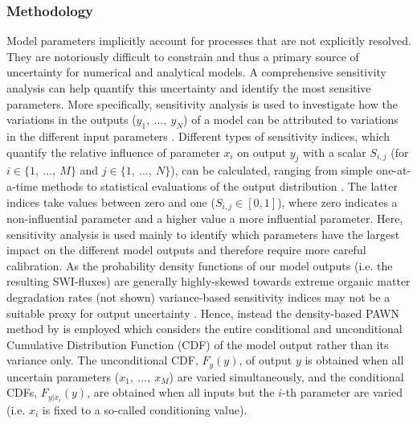 \documentclass[gmd, manuscript]{copernicus}
\begin{document}
\subsubsection{Methodology}
Model parameters implicitly account for processes that are not explicitly resolved. They are notoriously difficult to constrain and thus a primary source of uncertainty for numerical and analytical models. 
A comprehensive sensitivity analysis can help quantify this uncertainty and identify the most sensitive parameters. More specifically, sensitivity analysis is used to investigate how the variations in the outputs 
($y_1,\ ...,\ y_N$) of a model can be attributed to variations in the different input parameters \citep[$x_1,\ ...,\ x_M$,][]{pianosi_sensitivity_2016}. 
Different types of sensitivity indices, which quantify the relative influence of parameter $x_i$ on output $y_j$ with a scalar $S_{i,j}$ 
(for $i \in \{1,\ ...,\ M \}$ and $j \in \{1,\ ...,\ N \}$), can be calculated, ranging from simple one-at-a-time methods to statistical evaluations of the output 
distribution \citep[e.g. variance-based or density-based approaches][]{pianosi_sensitivity_2016}. The latter indices 
take values between zero and one ($S_{i,j} \in [0, 1]$), where zero indicates a non-influential parameter and a higher value a more influential parameter. 
Here, sensitivity analysis is used mainly to identify which parameters have the largest impact on the different model outputs and therefore require more careful calibration. 
As the probability density functions of our model outputs (i.e. the resulting SWI-fluxes) are generally highly-skewed towards extreme organic matter degradation rates (not shown) variance-based sensitivity indices 
may not be a suitable proxy for output uncertainty \citep{pianosi_sensitivity_2016}. 
Hence, instead the density-based PAWN method by \citet{pianosi_simple_2015} is employed which considers the entire conditional and unconditional Cumulative Distribution Function (CDF) of the model output
rather than its variance only. The unconditional CDF, $F_y(y)$, of output $y$ is obtained when all uncertain parameters ($x_1,\ ...,\ x_M$) are varied simultaneously, 
and the conditional CDFs, $F_{y|x_i}(y)$, are obtained when all inputs but the $i$-th parameter are varied (i.e. $x_i$ is fixed to a so-called conditioning value). 
\end{document}
